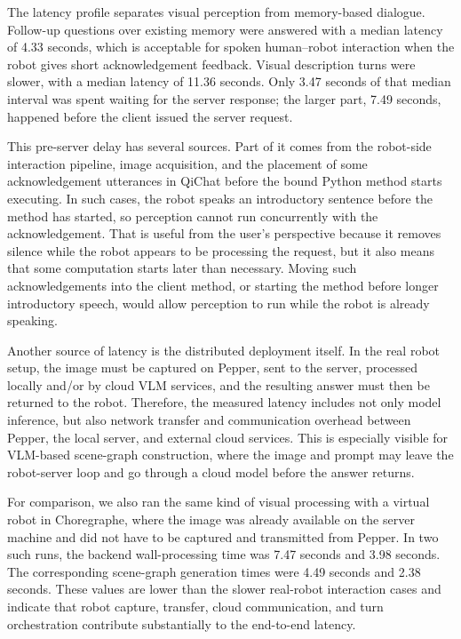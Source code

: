 The latency profile separates visual perception from memory-based dialogue. Follow-up questions over existing memory were answered with a median latency of 4.33 seconds, which is acceptable for spoken human--robot interaction when the robot gives short acknowledgement feedback. Visual description turns were slower, with a median latency of 11.36 seconds. Only 3.47 seconds of that median interval was spent waiting for the server response; the larger part, 7.49 seconds, happened before the client issued the server request.

This pre-server delay has several sources. Part of it comes from the robot-side interaction pipeline, image acquisition, and the placement of some acknowledgement utterances in QiChat before the bound Python method starts executing. In such cases, the robot speaks an introductory sentence before the method has started, so perception cannot run concurrently with the acknowledgement. That is useful from the user's perspective because it removes silence while the robot appears to be processing the request, but it also means that some computation starts later than necessary. Moving such acknowledgements into the client method, or starting the method before longer introductory speech, would allow perception to run while the robot is already speaking.

Another source of latency is the distributed deployment itself. In the real robot setup, the image must be captured on Pepper, sent to the server, processed locally and/or by cloud VLM services, and the resulting answer must then be returned to the robot. Therefore, the measured latency includes not only model inference, but also network transfer and communication overhead between Pepper, the local server, and external cloud services. This is especially visible for VLM-based scene-graph construction, where the image and prompt may leave the robot-server loop and go through a cloud model before the answer returns.

For comparison, we also ran the same kind of visual processing with a virtual robot in Choregraphe, where the image was already available on the server machine and did not have to be captured and transmitted from Pepper. In two such runs, the backend wall-processing time was 7.47 seconds and 3.98 seconds. The corresponding scene-graph generation times were 4.49 seconds and 2.38 seconds. These values are lower than the slower real-robot interaction cases and indicate that robot capture, transfer, cloud communication, and turn orchestration contribute substantially to the end-to-end latency.

